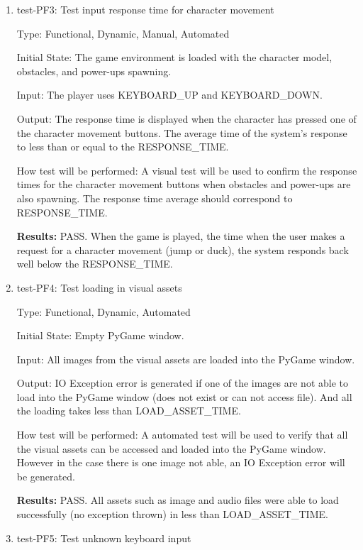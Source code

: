 \documentclass[12pt, titlepage]{article}
\begin{document}
\begin{enumerate}
\item{test-PF3: Test input response time for character movement\\}

Type: Functional, Dynamic, Manual, Automated
					
Initial State: The game environment is loaded with the character model, obstacles, and power-ups spawning.

Input: The player uses KEYBOARD\_UP and KEYBOARD\_DOWN.
					
Output: The response time is displayed when the character has pressed one of the character movement buttons. The average time of the system's response to less than or equal to the RESPONSE\_TIME.
					
How test will be performed: A visual test will be used to confirm the response times for the character movement buttons when obstacles and power-ups are also spawning. The response time average should correspond to RESPONSE\_TIME. 

\textbf{Results:} PASS. When the game is played, the time when the user makes a request for a character movement (jump or duck), the system responds back well below the RESPONSE\_TIME. 

\item{test-PF4: Test loading in visual assets \\}

Type: Functional, Dynamic, Automated
					
Initial State: Empty PyGame window.

Input: All images from the visual assets are loaded into the PyGame window.
					
Output: IO Exception error is generated if one of the images are not able to load into the PyGame window (does not exist or can not access file). And all the loading takes less than LOAD\_ASSET\_TIME. 
					
How test will be performed: A automated test will be used to verify that all the visual assets can be accessed and loaded into the PyGame window. However in the case there is one image not able,  an IO Exception error will be generated.

\textbf{Results:} PASS. All assets such as image and audio files were able to load successfully (no exception thrown) in less than LOAD\_ASSET\_TIME.

\item{test-PF5: Test unknown keyboard input \\}


\end{enumerate}
\end{document}
